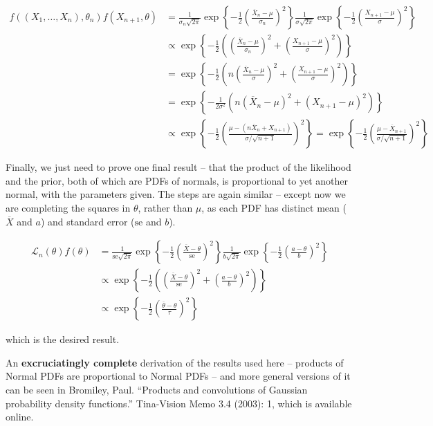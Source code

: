 \begin{align} 
f((X_1, \dots, X_n), \theta_n) f(X_{n+1}, \theta) &= 
\frac{1}{\sigma_n \sqrt{2 \pi}} \exp \left\{-\frac{1}{2} \left(\frac{\overline{X}_n - \mu}{\sigma_n} \right)^2 \right\}
\frac{1}{\sigma \sqrt{2 \pi}} \exp \left\{-\frac{1}{2} \left(\frac{X_{n+1} - \mu}{\sigma} \right)^2 \right\} \\
&\propto \exp \left\{-\frac{1}{2} \left( \left(\frac{\overline{X}_n - \mu}{\sigma_n} \right)^2 + \left(\frac{X_{n+1} - \mu}{\sigma} \right)^2 \right) \right\} \\
&= \exp \left\{-\frac{1}{2} \left( n \left(\frac{\overline{X}_n - \mu}{\sigma} \right)^2 + \left(\frac{X_{n+1} - \mu}{\sigma} \right)^2 \right) \right\} \\
&= \exp \left\{-\frac{1}{2 \sigma^2} \left( n \left(\overline{X}_n - \mu\right)^2 + \left(X_{n+1} - \mu \right)^2 \right) \right\} \\
&\propto \exp \left\{-\frac{1}{2} \left( \frac{\mu - (n\overline{X}_n + X_{n+1})}{\sigma / \sqrt{n+1}} \right)^2 \right\}
= \exp \left\{-\frac{1}{2}
\left(\frac{\mu - \overline{X}_{n+1}}{\sigma / \sqrt{n+1}}\right)^2
\right\}
\end{align}

Finally, we just need to prove one final result -- that the product of
the likelihood and the prior, both of which are PDFs of normals, is
proportional to yet another normal, with the parameters given. The steps
are again similar -- except now we are completing the squares in
\(\theta\), rather than \(\mu\), as each PDF has distinct mean
(\(\overline{X}\) and \(a\)) and standard error (\(\text{se}\) and
\(b\)).

\begin{align}
\mathcal{L}_n(\theta) f(\theta) 
&= \frac{1}{\text{se} \sqrt{2 \pi}} \exp \left\{-\frac{1}{2} \left(\frac{\overline{X} - \theta}{\text{se}}\right)^2 \right\} \frac{1}{b \sqrt{2 \pi}} \exp \left\{-\frac{1}{2} \left( \frac{a - \theta}{b} \right)^2 \right\} \\
& \propto \exp \left\{-\frac{1}{2} \left( \left(\frac{\overline{X} - \theta}{\text{se}}\right)^2 + \left( \frac{a - \theta}{b} \right)^2 \right) \right\} \\
& \propto \exp \left\{-\frac{1}{2} \left( \frac{\overline{\theta} - \theta}{\tau} \right)^2 \right\}
\end{align}

which is the desired result.

An \textbf{excruciatingly complete} derivation of the results used here
-- products of Normal PDFs are proportional to Normal PDFs -- and more
general versions of it can be seen in Bromiley, Paul. ``Products and
convolutions of Gaussian probability density functions.'' Tina-Vision
Memo 3.4 (2003): 1, which is available online.


